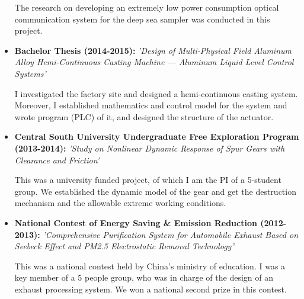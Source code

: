 \documentclass[11pt,a4paper,sans]{moderncv}         %
\begin{document}
\begin{itemize}
{    \vspace{3pt}

    \small{The research on developing an extremely low power consumption optical communication system for the deep sea sampler was conducted in this project.}}

    \vspace{6pt}

    \item{\textbf{Bachelor Thesis (2014-2015): }\textit{'Design of Multi-Physical Field Aluminum Alloy Hemi-Continuous Casting Machine — Aluminum Liquid Level Control Systems'}

    \vspace{3pt}

    \small{I investigated the factory site and designed a hemi-continuous casting system. Moreover, I established mathematics and control model for the system and wrote program (PLC) of it, and designed the structure of the actuator.}}

    \vspace{6pt}

    \item{\textbf{Central South University Undergraduate Free Exploration Program (2013-2014): }\textit{'Study on Nonlinear Dynamic Response of Spur Gears with Clearance and Friction'}

    \vspace{3pt}

    \small{This was a university funded project, of which I am the PI of a 5-student group. We established the dynamic model of the gear and get the destruction mechanism and the allowable extreme working conditions.}}

    \vspace{6pt}

    \item{\textbf{National Contest of Energy Saving \& Emission Reduction (2012-2013): }\textit{'Comprehensive Purification System for Automobile Exhaust Based on Seebeck Effect and PM2.5 Electrostatic Removal Technology'}

    \vspace{3pt}

    \small{This was a national contest held by China's ministry of education. I was a key member of a 5 people group, who was in charge of the design of an exhaust processing system. We won a national second prize in this contest.}}

    \end{itemize}
\end{document}
